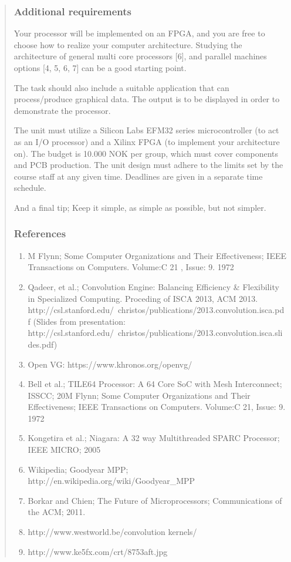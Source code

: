 \begin{quotation}
\subsubsection{Additional requirements}
Your processor will be implemented on an FPGA, and you are free to choose how to realize  your computer architecture.
Studying the architecture of general multi core processors [6], and parallel machines options [4, 5, 6, 7] can be a good starting point.

The task should also include a suitable application that can process/produce graphical data. 
The output is to be displayed in order to demonstrate the processor. 

The unit must utilize a Silicon Labs EFM32 series microcontroller (to act as an I/O processor) and a Xilinx FPGA (to implement your architecture on).
The budget is 10.000 NOK per group, which must cover components and PCB production. 
The unit design must adhere to the limits set by the course staff at any given time.
Deadlines are given in a separate time schedule.

And a final tip; Keep it simple, as simple as possible, but not simpler.

\subsubsection{References}
\begin{enumerate}
    \item M Flynn; Some Computer Organizations and Their Effectiveness; IEEE Transactions on Computers. Volume:C 21 ,  Issue: 9. 1972
    \item Qadeer, et al.; Convolution Engine: Balancing Efficiency \& Flexibility in Specialized 
Computing. Proceding of ISCA 2013, ACM 2013. 
http://csl.stanford.edu/~christos/publications/2013.convolution.isca.pdf  (Slides from 
presentation:\\ 
http://csl.stanford.edu/~christos/publications/2013.convolution.isca.slides.pdf)
    \item Open VG: https://www.khronos.org/openvg/ 
    \item Bell et al.; TILE64 Processor: A 64 Core SoC with Mesh Interconnect; ISSCC; 20M 
Flynn; Some Computer Organizations and Their Effectiveness; IEEE Transactions on 
Computers. Volume:C 21, Issue: 9. 1972
    \item Kongetira et al.; Niagara: A 32 way Multithreaded SPARC Processor; IEEE MICRO; 
2005
    \item Wikipedia; Goodyear MPP; http://en.wikipedia.org/wiki/Goodyear\_MPP
    \item Borkar and Chien; The Future of Microprocessors; Communications of the ACM; 
2011.
    \item http://www.westworld.be/convolution kernels/
    \item http://www.ke5fx.com/crt/8753aft.jpg
\end{enumerate}
\end{quotation}

